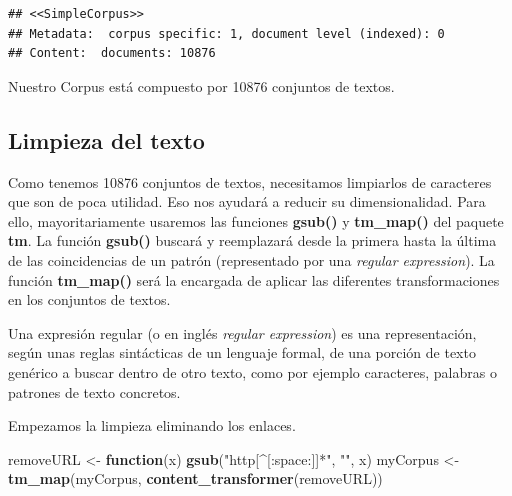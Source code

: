 \documentclass[]{article}
\newenvironment{Shaded}{\begin{snugshade}}{\end{snugshade}}
\newcommand{\ControlFlowTok}[1]{\textcolor[rgb]{0.13,0.29,0.53}{\textbf{#1}}}
\newcommand{\KeywordTok}[1]{\textcolor[rgb]{0.13,0.29,0.53}{\textbf{#1}}}
\newcommand{\NormalTok}[1]{#1}
\newcommand{\OperatorTok}[1]{\textcolor[rgb]{0.81,0.36,0.00}{\textbf{#1}}}
\newcommand{\StringTok}[1]{\textcolor[rgb]{0.31,0.60,0.02}{#1}}
\begin{document}
\begin{Shaded}
\end{Shaded}

\begin{verbatim}
## <<SimpleCorpus>>
## Metadata:  corpus specific: 1, document level (indexed): 0
## Content:  documents: 10876
\end{verbatim}

Nuestro Corpus está compuesto por 10876 conjuntos de textos.

\hypertarget{limpieza-del-texto}{%
\subsection{Limpieza del texto}\label{limpieza-del-texto}}

Como tenemos 10876 conjuntos de textos, necesitamos limpiarlos de caracteres que son de poca
utilidad. Eso nos ayudará a reducir su dimensionalidad. Para ello, mayoritariamente usaremos las funciones \textbf{gsub()} y \textbf{tm\_map()} del paquete \textbf{tm}. La función \textbf{gsub()} buscará y reemplazará desde la primera hasta la última de las coincidencias de un patrón (representado por una \emph{regular expression}). La función \textbf{tm\_map()} será la encargada de aplicar las diferentes transformaciones en los conjuntos de textos.

\begin{tcolorbox}
	Una expresión regular (o en inglés \emph{regular expression}) es una
	representación, según unas reglas sintácticas de un lenguaje formal, de
	una porción de texto genérico a buscar dentro de otro texto, como por
	ejemplo caracteres, palabras o patrones de texto concretos.
\end{tcolorbox}

Empezamos la limpieza eliminando los enlaces.

\begin{Shaded}
\begin{Highlighting}[]
\NormalTok{removeURL <-}\StringTok{ }\ControlFlowTok{function}\NormalTok{(x) }\KeywordTok{gsub}\NormalTok{(}\StringTok{"http[^[:space:]]*"}\NormalTok{, }\StringTok{""}\NormalTok{, x)  }
\NormalTok{myCorpus <-}\StringTok{ }\KeywordTok{tm_map}\NormalTok{(myCorpus, }\KeywordTok{content_transformer}\NormalTok{(removeURL))}
\end{Highlighting}
\end{Shaded}
\end{document}
